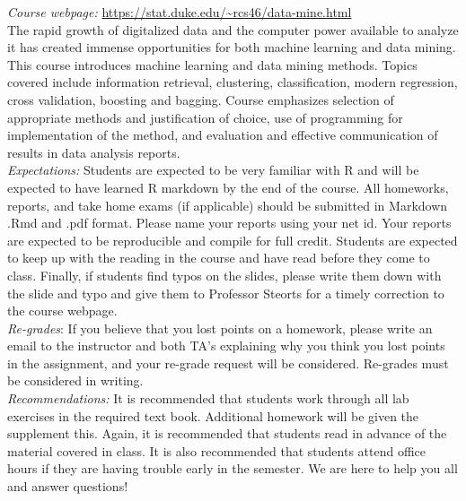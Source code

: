 \documentclass[11pt]{article}
\begin{document}
\emph{Course webpage:} \url{https://stat.duke.edu/~rcs46/data-mine.html} \\
The rapid growth of digitalized data and the computer power available to analyze it has created immense opportunities for both machine learning and data mining. This course introduces machine learning and data mining methods. Topics covered include information retrieval, clustering, classification, modern regression, cross validation, boosting and bagging. Course emphasizes selection of appropriate methods and justification of choice, use of programming for implementation of the method, and evaluation and effective communication of results in data analysis reports. \\


\emph{Expectations:} Students are expected to be very familiar with R and will be expected to have learned R markdown by the end of the course. All homeworks, reports, and take home exams (if applicable) should be submitted in Markdown .Rmd and .pdf format. Please name your reports using your net id. Your reports are expected to be reproducible and compile for full credit. Students are expected to keep up with the reading in the course and have read before they come to class. Finally, if students find typos on the slides, please write them down with the slide and typo and give them to Professor Steorts for a timely correction to the course webpage.  \\

\emph{Re-grades}: If you believe that you lost points on a homework, please write an email to the instructor and both TA's explaining why you think you lost points in the assignment, and your re-grade request will be considered. Re-grades must be considered in writing. \\

\emph{Recommendations:} It is recommended that students work through all lab exercises in the required text book. Additional homework will be given the supplement this. Again, it is recommended that students read in advance of the material covered in class. It is also recommended that students attend office hours if they are having trouble early in the semester. We are here to help you all and answer questions! \\
\end{document}
